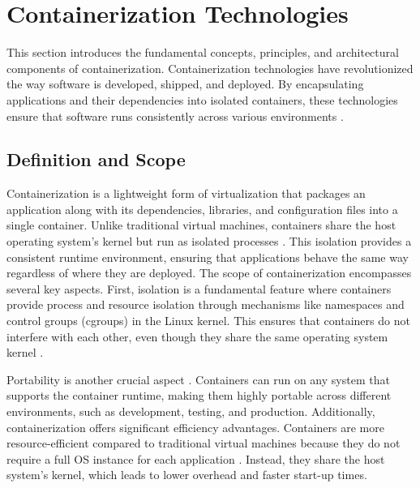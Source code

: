 \section{Containerization Technologies}

This section introduces the fundamental concepts, principles, and architectural
components of containerization. Containerization technologies have revolutionized
the way software is developed, shipped, and deployed. By encapsulating applications
and their dependencies into isolated containers, these technologies ensure that
software runs consistently across various environments \cite[Under the Hood]
{merkelDockerLightweightLinux2014}.

\subsection{Definition and Scope}

Containerization is a lightweight form of virtualization \cite[Containers vs. Other
	Types of Virtualization]{merkelDockerLightweightLinux2014} that packages an
application along with its dependencies, libraries, and configuration files into a
single container. Unlike traditional virtual machines, containers share the host
operating system's kernel but run as isolated processes \cite[Containers vs. Other
	Types of Virtualization]{merkelDockerLightweightLinux2014}. This isolation provides
a consistent runtime environment, ensuring that applications behave the same way
regardless of where they are deployed.
The scope of containerization encompasses several key aspects. First, isolation is
a fundamental feature where containers provide process and resource isolation
through mechanisms like namespaces \cite[Under the Hood]{merkelDockerLightweightLinux2014}
and control groups (cgroups) \cite[Under the Hood]{merkelDockerLightweightLinux2014}
in the Linux kernel. This ensures that containers do not interfere with each other,
even though they share the same operating system kernel \cite{OperatingSystem2024}.

Portability is another crucial aspect \cite{SoftwarePortability2024}. Containers can
run on any system that supports the container runtime, making them highly portable
across different environments, such as development, testing, and production.
Additionally, containerization offers significant efficiency advantages. Containers
are more resource-efficient compared to traditional virtual machines because they
do not require a full OS instance for each application \cite[Under the Hood]
{merkelDockerLightweightLinux2014}. Instead, they share the host system's kernel,
which leads to lower overhead and faster start-up times.

